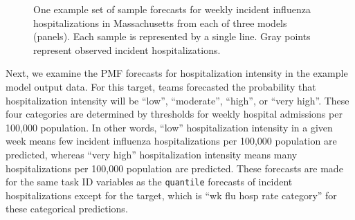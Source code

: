 \documentclass[
]{article}
\begin{document}
\begin{figure}[H]


\caption{\label{fig-plot-ex-mod-samps}One example set of sample
forecasts for weekly incident influenza hospitalizations in
Massachusetts from each of three models (panels). Each sample is
represented by a single line. Gray points represent observed incident
hospitalizations.}

\end{figure}%

Next, we examine the PMF forecasts for hospitalization intensity in the
example model output data. For this target, teams forecasted the
probability that hospitalization intensity will be ``low'',
``moderate'', ``high'', or ``very high''. These four categories are
determined by thresholds for weekly hospital admissions per 100,000
population. In other words, ``low'' hospitalization intensity in a given
week means few incident influenza hospitalizations per 100,000
population are predicted, whereas ``very high'' hospitalization
intensity means many hospitalizations per 100,000 population are
predicted. These forecasts are made for the same task ID variables as
the \texttt{quantile} forecasts of incident hospitalizations except for
the target, which is ``wk flu hosp rate category'' for these categorical
predictions.
\end{document}
